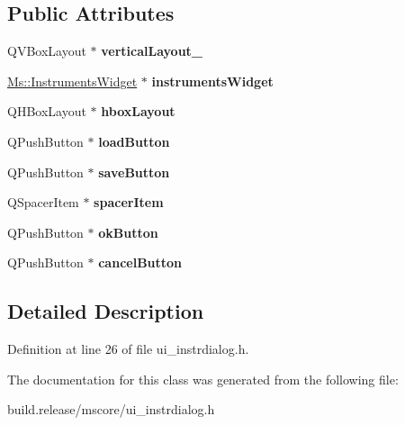 \subsection*{Public Attributes}
\begin{DoxyCompactItemize}
\item 
\mbox{\label{class_ui___instruments_dialog_a9854815db0b3b1112813726bc9b4ee08}} 
Q\+V\+Box\+Layout $\ast$ {\bfseries vertical\+Layout\+\_}
\item 
\mbox{\label{class_ui___instruments_dialog_a07947619353df8eded39c52319a73002}} 
\hyperlink{class_ms_1_1_instruments_widget}{Ms\+::\+Instruments\+Widget} $\ast$ {\bfseries instruments\+Widget}
\item 
\mbox{\label{class_ui___instruments_dialog_ae0a4c71d38c244aba86a1e61d6be4be3}} 
Q\+H\+Box\+Layout $\ast$ {\bfseries hbox\+Layout}
\item 
\mbox{\label{class_ui___instruments_dialog_a83454e73a40b99d5051eae1e6787fb3b}} 
Q\+Push\+Button $\ast$ {\bfseries load\+Button}
\item 
\mbox{\label{class_ui___instruments_dialog_a8864f3fc3b287c50e047b35720392eb1}} 
Q\+Push\+Button $\ast$ {\bfseries save\+Button}
\item 
\mbox{\label{class_ui___instruments_dialog_a1cf7f53d04483693923b415e017651dd}} 
Q\+Spacer\+Item $\ast$ {\bfseries spacer\+Item}
\item 
\mbox{\label{class_ui___instruments_dialog_a4f9f8db5c24d97b1652aa303824919df}} 
Q\+Push\+Button $\ast$ {\bfseries ok\+Button}
\item 
\mbox{\label{class_ui___instruments_dialog_a2c8853ec6adb7aa14b55c29ab4e900b8}} 
Q\+Push\+Button $\ast$ {\bfseries cancel\+Button}
\end{DoxyCompactItemize}


\subsection{Detailed Description}


Definition at line 26 of file ui\+\_\+instrdialog.\+h.



The documentation for this class was generated from the following file\+:\begin{DoxyCompactItemize}
\item 
build.\+release/mscore/ui\+\_\+instrdialog.\+h\end{DoxyCompactItemize}
